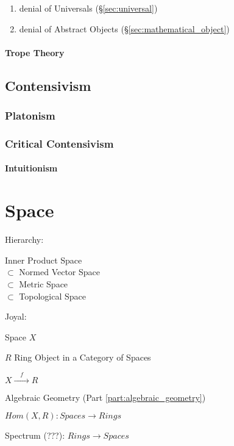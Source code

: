 \begin{enumerate}
  \item denial of Universals (\S\ref{sec:universal})
  \item denial of Abstract Objects (\S\ref{sec:mathematical_object})
\end{enumerate}



\paragraph{Trope Theory}\label{sec:trope_theory}



\subsection{Contensivism}\label{sec:contensivism}

\subsubsection{Platonism}\label{sec:platonism}

\subsubsection{Critical Contensivism}\label{sec:critical_contensivism}

\paragraph{Intuitionism}\label{sec:intuitionism}



\section{Space}\label{sec:space}

Hierarchy:

Inner Product Space \hfill \\
$\subset$ Normed Vector Space \hfill \\
$\subset$ Metric Space \hfill \\
$\subset$ Topological Space

Joyal: %

Space $X$

$R$ Ring Object in a Category of Spaces

$X \xrightarrow{\quad f \quad} R$

Algebraic Geometry (Part \ref{part:algebraic_geometry})

$Hom(X,R) : Spaces \rightarrow Rings$

Spectrum (???): $Rings \rightarrow Spaces$
